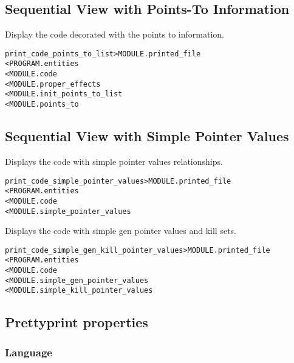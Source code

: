 \documentclass[a4paper]{report}
\newenvironment{PipsMake}{\begin{alltt}}{\end{alltt}}
\newenvironment{PipsPass}[1]{\label{pass:#1}}{}
\begin{document}
\subsection{Sequential View with Points-To  Information}

Display the code decorated with the points to information.

\begin{PipsMake}
print_code_points_to_list      > MODULE.printed_file
        < PROGRAM.entities
        < MODULE.code
        < MODULE.proper_effects
        < MODULE.init_points_to_list
        < MODULE.points_to
\end{PipsMake}

\subsection{Sequential View with Simple Pointer Values}

\begin{PipsPass}{print_code_simple_pointer_values}
Displays the code with simple pointer values relationships.
\end{PipsPass}

\begin{PipsMake}
print_code_simple_pointer_values      > MODULE.printed_file
        < PROGRAM.entities
        < MODULE.code
        < MODULE.simple_pointer_values
\end{PipsMake}

\begin{PipsPass}{print_code_genkill_pointer_values}
Displays the code with simple gen pointer values and kill sets.
\end{PipsPass}

\begin{PipsMake}
print_code_simple_gen_kill_pointer_values      > MODULE.printed_file
        < PROGRAM.entities
        < MODULE.code
        < MODULE.simple_gen_pointer_values
        < MODULE.simple_kill_pointer_values

\end{PipsMake}

\subsection{Prettyprint properties}


\subsubsection{Language}
\end{document}
